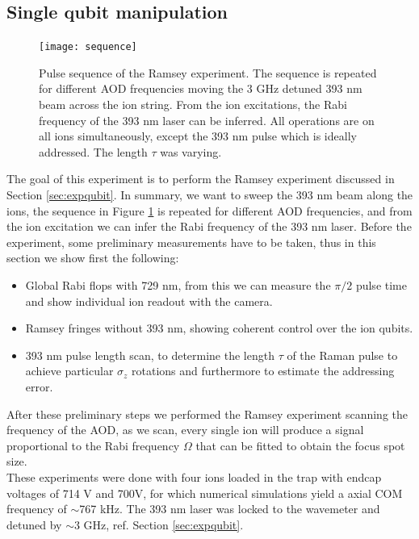 \subsection{Single qubit manipulation}
\label{sec:singlequbitmanipulation}
\begin{figure}[H]
\centering
\texttt{[image: sequence]}
\caption{Pulse sequence of the Ramsey experiment. The sequence is repeated for different AOD frequencies moving the 3 GHz detuned 393 nm beam across the ion string. From the ion excitations, the Rabi frequency of the 393 nm laser can be inferred. All operations are on all ions simultaneously, except the 393 nm pulse which is ideally addressed. The length $\tau$ was varying.}
\label{sequence}
\end{figure}
The goal of this experiment is to perform the Ramsey experiment discussed in Section \ref{sec:expqubit}. In summary, we want to sweep the 393 nm beam along the ions, the sequence in Figure \ref{sequence} is repeated for different AOD frequencies, and from the ion excitation we can infer the Rabi frequency of the 393 nm laser. Before the experiment, some preliminary measurements have to be taken, thus in this section we show first the following:
\begin{itemize}
\item Global Rabi flops with 729 nm, from this we can measure the $\pi/2$ pulse time and show individual ion readout with the camera.
\item Ramsey fringes without 393 nm, showing coherent control over the ion qubits.
\item 393 nm pulse length scan, to determine the length $\tau$ of the Raman pulse to achieve particular $\sigma_z$ rotations and furthermore to estimate the addressing error.
\end{itemize}
After these preliminary steps we performed the Ramsey experiment scanning the frequency of the AOD, as we scan, every single ion will produce a signal proportional to the Rabi frequency $\Omega$ that can be fitted to obtain the focus spot size.\\
These experiments were done with four ions loaded in the trap with endcap voltages of 714 V and 700V, for which numerical simulations yield a axial COM frequency of $\sim$767 kHz. The 393 nm laser was locked to the wavemeter and detuned by $\sim$3 GHz, ref. Section \ref{sec:expqubit}.\\

